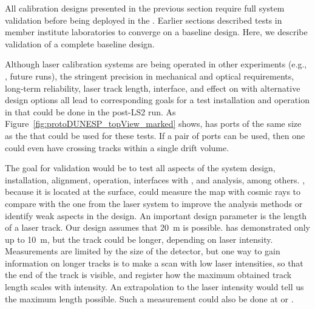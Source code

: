 

All calibration designs presented in the previous section require full system validation before being deployed in the  . Earlier sections described tests in member institute laboratories 
to converge on a baseline design. Here, we describe validation of a complete baseline design.

Although laser calibration systems are being operated
in other  experiments (e.g., , future  runs), the stringent precision 
in mechanical and optical requirements, long-term reliability, laser track length,  interface, and effect on \efield with alternative design options all lead to corresponding goals for a test installation and operation in  that could be done in the post-LS2 run. As Figure~\ref{fig:protoDUNESP_topView_marked} shows,  has ports of the same size as the   that could 
 be used for these tests. If a pair of ports can be used, then one could even have crossing tracks within a single drift volume. 

The goal for validation would be to test all aspects of the system design, installation, alignment, operation, interfaces with , and analysis, among others. , because it is located at the surface, could measure the \efield map with cosmic rays to compare with the one from the laser system to improve the analysis methods or identify weak aspects in the design. An important design parameter is the length of a laser track. Our design assumes that \SI{20}{\m} is possible.  has demonstrated only up to \SI{10}{\m}, but the track could be longer, depending on laser intensity. Measurements are limited by the size of the detector, but one way to gain information on longer tracks is %
to make a scan with low laser intensities, so that the end of the track is  visible, and register how the maximum obtained track length scales with intensity. An extrapolation to the   laser intensity would tell us the maximum length possible. Such a measurement could also be done at  or .

